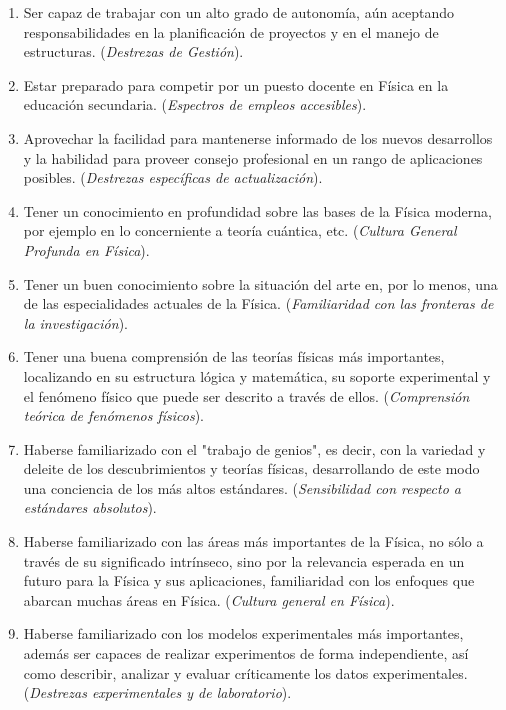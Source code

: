 \begin{enumerate}
\item Ser capaz de trabajar con un alto grado de autonomía, aún aceptando responsabilidades en la planificación de proyectos y en el manejo de estructuras. (\emph{Destrezas de Gestión}).

\item Estar preparado para competir por un puesto docente en Física en la educación secundaria. (\emph{Espectros de empleos accesibles}).

\item Aprovechar la facilidad para mantenerse informado de los nuevos desarrollos y la habilidad para proveer consejo profesional en un rango de aplicaciones posibles. (\emph{Destrezas específicas de actualización}).

\item Tener un conocimiento en profundidad sobre las bases de la Física moderna, por ejemplo en lo concerniente a teoría cuántica, etc. (\emph{Cultura General Profunda en Física}).

\item Tener un buen conocimiento sobre la situación del arte en, por lo menos, una de las especialidades actuales de la Física. (\emph{Familiaridad con las fronteras de la investigación}).

\item Tener una buena comprensión de las teorías físicas más importantes, localizando en su estructura lógica y matemática, su soporte experimental y el fenómeno físico que puede ser descrito a través de ellos. (\emph{Comprensión teórica de fenómenos físicos}).

\item Haberse familiarizado con el "trabajo de genios", es decir, con la variedad y deleite de los descubrimientos y teorías físicas, desarrollando de este modo una conciencia de los más altos estándares. (\emph{Sensibilidad con respecto a estándares absolutos}).

\item Haberse familiarizado con las áreas más importantes de la Física, no sólo a través de su significado intrínseco, sino por la relevancia esperada en un futuro para la Física y sus aplicaciones, familiaridad con los enfoques que abarcan muchas áreas en Física. (\emph{Cultura general en Física}).

\item Haberse familiarizado con los modelos experimentales más importantes, además ser capaces de realizar experimentos de forma independiente, así como describir, analizar y evaluar críticamente los datos experimentales. (\emph{Destrezas experimentales y de laboratorio}).


\end{enumerate}
